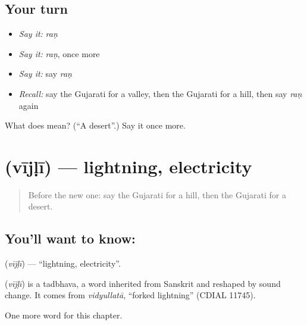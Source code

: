 \subsection*{Your turn}
\begin{itemize}
\raggedright
  \item \emph{Say it:} \emph{raṇ}
  \item \emph{Say it:} \emph{raṇ}, once more
  \item \emph{Say it:} say \emph{raṇ}
  \item \emph{Recall:} say the Gujarati for a valley, then the Gujarati for a hill, then say \emph{raṇ} again
\end{itemize}

\begin{tcolorbox}[breakable,colback=teal!4,colframe=teal!35!black,title={Before you move on}]
What does  mean? (\textquotedblleft{}A desert\textquotedblright{}.) Say it once more.
\end{tcolorbox}
\section[\texorpdfstring{\gu{વીજળી} (vījḷī)}{વીજળી (vījḷī)}]{ (vījḷī) — lightning, electricity}

\label{lesson:GU-C120-vijli}



\begin{quote}
Before the new one: say the Gujarati for a hill, then the Gujarati for a desert.
\end{quote}

\subsection*{You'll want to know: }
\textbf{} (\emph{vījḷī}) — \textquotedblleft{}lightning, electricity\textquotedblright{}.

\begin{cousinweb}
\textbf{} (\emph{vījḷī}) is a tadbhava, a word inherited from Sanskrit and reshaped by sound change. It comes from \emph{vidyullatā}, \textquotedblleft{}forked lightning\textquotedblright{} (CDIAL 11745).
\end{cousinweb}

\begin{grammarlens}[title={What you've built}]
One more word for this chapter.
\end{grammarlens}

